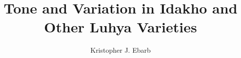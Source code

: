\title{Tone and Variation in Idakho and Other Luhya
        Varieties}  %
\author{Kristopher J. Ebarb}
\renewcommand{\lsISBNdigital}{000-0-000000-00-0}
\renewcommand{\lsISBNhardcover}{000-0-000000-00-0}
\renewcommand{\lsISBNsoftcover}{000-0-000000-00-0}
\renewcommand{\lsISBNsoftcoverus}{000-0-000000-00-0}
\renewcommand{\lsSeries}{calseries} %
\renewcommand{\lsSeriesNumber}{99} %

 
 
 
 
  

